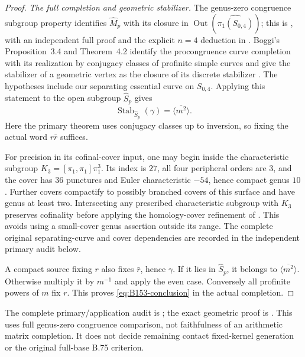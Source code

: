\begin{proof}
\emph{The full completion and geometric stabilizer.}
The genus-zero congruence subgroup property identifies
$\widehat M_p$ with its closure in
$\operatorname{Out}(\widehat{\pi_1(S_{0,4})})$; this is
\cite{Asada2001}, with an independent full proof and the explicit
$n=4$ deduction in \cite{BMcReynoldsPureBraidCSP2012}.
Boggi's Proposition~3.4 and Theorem~4.2 identify the procongruence
curve completion with its realization by conjugacy classes of
profinite simple curves and give the stabilizer of a geometric vertex
as the closure of its discrete stabilizer
\cite{CEBoggiProcongruence2014}.
The hypotheses include our separating essential curve on $S_{0,4}$.
Applying this statement to the open subgroup $\widehat S_p$ gives
\[
 \operatorname{Stab}_{\widehat S_p}(\gamma)
       =\overline{\langle m^2\rangle}.
\]
Here the primary theorem uses conjugacy classes up to inversion, so
fixing the actual word $r\bar r$ suffices.

For precision in its cofinal-cover input, one may begin inside the
characteristic subgroup $K_3=[\pi_1,\pi_1]\pi_1^3$. Its index is
$27$, all four peripheral orders are $3$, and the cover has $36$
punctures and Euler characteristic $-54$, hence compact genus $10$.
Further covers compactify to possibly branched covers of this surface
and have genus at least two. Intersecting any prescribed characteristic
subgroup with $K_3$ preserves cofinality before applying the
homology-cover refinement of
\cite[Lemma~3.10, Theorem~7.7 and Corollary~7.8]{BBoggiGaloisCoverings2014}.
This avoids using a small-cover genus assertion outside its range.
The complete original separating-curve and cover dependencies are
recorded in the independent primary audit below.

A compact source fixing $r$ also fixes $\bar r$, hence $\gamma$.
If it lies in $\widehat S_p$, it belongs to
$\overline{\langle m^2\rangle}$. Otherwise multiply it by $m^{-1}$
and apply the even case. Conversely all profinite powers of $m$ fix
$r$. This proves \eqref{eq:B153-conclusion} in the actual completion.
\end{proof}
The complete primary/application audit is
;
the exact geometric proof is
.
This uses full genus-zero congruence comparison, not faithfulness of an
arithmetic matrix completion. It does not decide remaining contact
fixed-kernel generation or the original full-base B.75 criterion.
